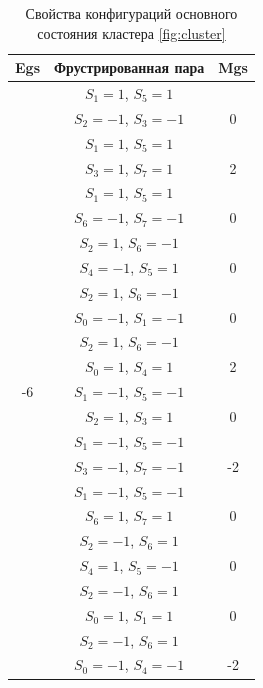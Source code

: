\documentclass[utf8, babel, sor, jor, amsmath, amssymb, reprint]{elsarticle} %
\begin{document}
\begin{table}[H]
	\centering
	\begin{tabular}{|c|c|c|}
		\hline
		Egs   &   Фрустрированная пара & Mgs\\
		\hline
		&  $S_1=1$, $S_5=1$ & \\
		&    $S_2=-1$, $S_3=-1$ &0 \\
		\cline{2-3}
		&  $S_1=1$, $S_5=1$ &\\
		&    $S_3=1$, $S_7=1$ & 2\\
		\cline{2-3}
		&  $S_1=1$, $S_5=1$ & \\
		&    $S_6=-1$, $S_7=-1$ & 0\\
		\cline{2-3}
		&  $S_2=1$, $S_6=-1$ & \\
		&    $S_4=-1$, $S_5=1$ & 0\\
		\cline{2-3}
		&  $S_2=1$, $S_6=-1$ &\\
		&    $S_0=-1$, $S_1=-1$ & 0\\
		\cline{2-3}
		&  $S_2=1$, $S_6=-1$ &\\
		&    $S_0=1$, $S_4=1$ & 2\\
		\cline{2-3}
		-6	\multirow{3}{*}{}
		&  $S_1=-1$, $S_5=-1$ &\\
		&    $S_2=1$, $S_3=1$ & 0\\
		\cline{2-3}
		&  $S_1=-1$, $S_5=-1$ &\\
		&    $S_3=-1$, $S_7=-1$ & -2\\
		\cline{2-3}
		&  $S_1=-1$, $S_5=-1$ &\\
		&    $S_6=1$, $S_7=1$ & 0\\
		\cline{2-3}
		&  $S_2=-1$, $S_6=1$ &\\
		&    $S_4=1$, $S_5=-1$ & 0\\
		\cline{2-3}
		&  $S_2=-1$, $S_6=1$ &\\
		&    $S_0=1$, $S_1=1$ & 0\\
		\cline{2-3}
		&  $S_2=-1$, $S_6=1$ &\\
		&    $S_0=-1$, $S_4=-1$ & -2\\
		\hline
	\end{tabular}
	\caption{Свойства конфигураций основного состояния кластера \eqref{fig:cluster}}
	\label{tab:gs_cl}
\end{table}
\end{document}
